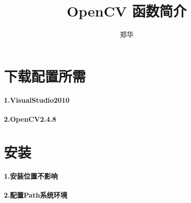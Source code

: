 \documentclass[UTF8,a4paper,8pt]{ctexart}
\author{郑华}
\title{OpenCV 函数简介}
\begin{document}
 
 	\maketitle
 		
\section{下载配置所需}
	\paragraph{1.VisualStudio2010}
	\paragraph{2.OpenCV2.4.8}
	
	
\section{安装}
	\paragraph{1.安装位置不影响}
	\paragraph{2.配置Path系统环境}	
	
	
\end{document}
